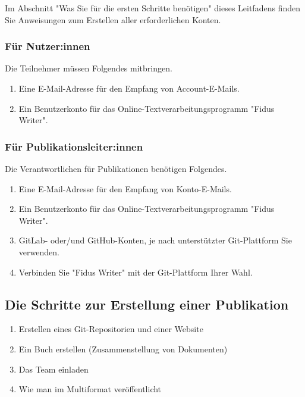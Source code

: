\documentclass{article}
\begin{document}
Im Abschnitt "Was Sie für die ersten Schritte benötigen" dieses Leitfadens finden Sie Anweisungen zum Erstellen aller erforderlichen Konten.


\subsubsection{Für Nutzer:innen}\label{H6462936}



Die Teilnehmer müssen Folgendes mitbringen.

\begin{enumerate}
\item Eine E-Mail-Adresse für den Empfang von Account-E-Mails.


\item Ein Benutzerkonto für das Online-Textverarbeitungsprogramm "Fidus Writer".


\end{enumerate}

\subsubsection{Für Publikationsleiter:innen}\label{H5586293}



Die Verantwortlichen für Publikationen benötigen Folgendes.

\begin{enumerate}
\item Eine E-Mail-Adresse für den Empfang von Konto-E-Mails.


\item Ein Benutzerkonto für das Online-Textverarbeitungsprogramm "Fidus Writer".


\item GitLab- oder/und GitHub-Konten, je nach unterstützter Git-Plattform Sie verwenden.


\item Verbinden Sie "Fidus Writer" mit der Git-Plattform Ihrer Wahl.


\end{enumerate}

\subsection{Die Schritte zur Erstellung einer Publikation}\label{H5940338}


\begin{enumerate}
\item Erstellen eines Git-Repositorien und einer Website


\item Ein Buch erstellen (Zusammenstellung von Dokumenten)


\item Das Team einladen


\item Wie man im Multiformat veröffentlicht


\end{enumerate}
\end{document}
